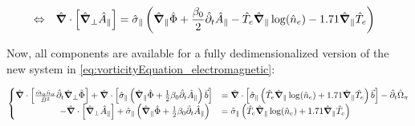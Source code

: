 \begin{align}
	&\Leftrightarrow&
	\hat{\grad}\cdot\left[\hat{\grad}_\perp \hat{A}_\parallel\right]
	&= \hat{\sigma}_\parallel\left(
	\hat{\grad}_\parallel\hat{\Phi}
	+ \frac{\beta_0}{2}\hat{\partial}_t\hat{A}_\parallel
	- \hat{T}_e\hat{\grad}_\parallel\log(\hat{n}_e)
	- 1.71\hat{\grad}_\parallel \hat{T}_e\right) \nonumber		
\end{align}

Now, all components are available for a fully dedimensionalized version of the new system in \autoref{eq:vorticityEquation_electromagnetic}: 

\begin{align}
	\label{eq:vorticityEquation_electromagnetic_dedimensionalized}
	\begin{cases}
		\hat{\grad}\cdot\left[\frac{\hat{m}_\alpha \hat{n}_\alpha}{ \hat{B}^2}\hat{\partial}_t\hat{\grad}_\perp\hat{\Phi}\right] + \hat{\grad}\cdot\left[\hat{\sigma}_\parallel\left(\hat{\grad}_\parallel\hat{\Phi}+ \frac{1}{2}\beta_0\hat{\partial}_t\hat{A}_\parallel\right)\vec{b}\right]
		&= \hat{\grad}\cdot\left[\hat{\sigma}_\parallel\left(
		\hat{T}_e\hat{\grad}_\parallel\log(\hat{n}_e) + 1.71\hat{\grad}_\parallel \hat{T}_e
		\right)\vec{b}\right]-\hat{\partial}_t \hat{\Omega}_\pi \\
		\qquad\qquad\quad-\hat{\grad}\cdot\left[\hat{\grad}_\perp \hat{A}_\parallel\right]
		+ \hat{\sigma}_\parallel\left(\hat{\grad}_\parallel\hat{\Phi}
		+ \frac{1}{2}\beta_0\hat{\partial}_t\hat{A}_\parallel\right) &= \hat{\sigma}_\parallel\left(
		\hat{T}_e\hat{\grad}_\parallel\log(\hat{n}_e) + 1.71\hat{\grad}_\parallel \hat{T}_e
		\right)
	\end{cases}
\end{align}

